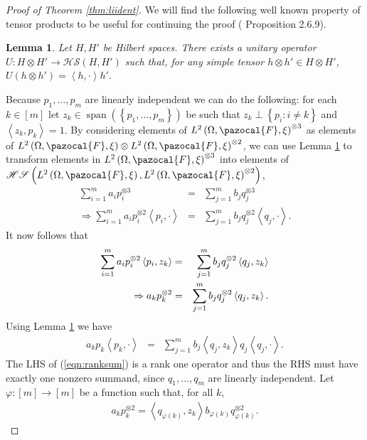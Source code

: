 \documentclass[aos,preprint]{imsart}
\def\l{\left}
\def\r{\right}
\def\sF{\pazocal{F}}
\def\hs{\mathscr{HS}}
\def\spn{\operatorname{span}}
\theoremstyle{plain}
\newtheorem{lem}{Lemma}[section]
\theoremstyle{defintion}
\begin{document}
\begin{proof}[Proof of Theorem \ref{thm:liident}]
		We will find the following well known property of tensor products to be useful for continuing the proof (\cite{kadison83} Proposition 2.6.9).
		\begin{lem} \label{lem:hstens}
			Let $H,H'$ be Hilbert spaces. There exists a unitary operator $U:H\otimes H' \to \hs\left( H,H' \right)$ such that, for any simple tensor $h\otimes h' \in H\otimes H'$, $U\left( h\otimes h' \right) = \l<h,\cdot\r> h'$.
		\end{lem}
		Because $p_1,\ldots,p_m$ are linearly independent we can do the following: for each $k \in \left[ m \right]$ let $z_k \in \spn\left(\l\{ p_1,\ldots,p_m \r\}\right)$ be such that $z_k \perp \left\{ p_i: i \neq k \right\}$ and $\l<z_k,p_k\r> =1$. By considering elements of $L^2\left( \Omega,\sF, \xi \right)^{\otimes 3}$ as elements of $L^2\left( \Omega,\sF, \xi \right) \otimes L^2\left( \Omega,\sF, \xi \right)^{\otimes 2}$, we can use Lemma \ref{lem:hstens} to transform elements in $L^2\left( \Omega,\sF, \xi \right)^{\otimes 3}$ into elements of $\hs\left( L^2\left( \Omega,\sF, \xi \right),L^2\left( \Omega,\sF, \xi \right)^{\otimes 2} \right)$,
		\begin{eqnarray*}
			\sum_{i=1}^m a_i p_i^{\otimes 3}   &=& \sum_{j=1}^m b_j q_j^{\otimes 3} \\
			\Rightarrow \sum_{i=1}^m a_i p_i^{\otimes 2}\l<p_i,\cdot\r>   &=& \sum_{j=1}^m b_j q_j^{\otimes 2} \l<q_j,\cdot\r>.
		\end{eqnarray*}
		It now follows that
		\begin{eqnarray*}
			\notag \sum_{i=1}^m a_i p_i^{\otimes 2}\l<p_i,z_k\r>   &=& \sum_{j=1}^m b_j q_j^{\otimes 2} \l<q_j,z_k\r>\\
			\Rightarrow a_k p_k^{\otimes 2}  &=& \sum_{j=1}^m b_j q_j^{\otimes 2} \l<q_j,z_k\r>.
		\end{eqnarray*}
		Using Lemma \ref{lem:hstens} we have
		\begin{eqnarray}\label{eqn:ranksum}
			a_k p_k\l<p_k,\cdot\r>  &=& \sum_{j=1}^m b_j\l<q_j,z_k\r> q_j\l<q_j,\cdot\r> .
		\end{eqnarray}
		The LHS of (\ref{eqn:ranksum}) is a rank one operator and thus the RHS must have exactly one nonzero summand, since $q_1,\ldots,q_m$ are linearly independent. Let $\varphi:\left[ m \right]\to \left[ m \right]$ be a function such that, for all $k$,
		\begin{eqnarray*}
			a_k p_k^{\otimes 2} =\l<q_{\varphi\left( k \right)},z_k\r> b_{\varphi\left( k \right)} q_{\varphi\left( k \right)}^{\otimes 2}.
		\end{eqnarray*}

\end{proof}
\end{document}
